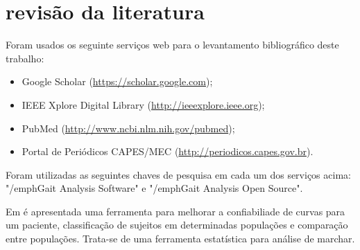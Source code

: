 \section[REVISÃO DA LITERATURA]{revisão da literatura}
Foram usados os seguinte serviços web para o levantamento bibliográfico deste trabalho:
\begin{itemize}
	\item Google Scholar (\href{https://scholar.google.com/}{https://scholar.google.com});
	\item IEEE Xplore Digital Library (\href{http://ieeexplore.ieee.org}{http://ieeexplore.ieee.org});
	\item PubMed (\href{http://www.ncbi.nlm.nih.gov/pubmed}{http://www.ncbi.nlm.nih.gov/pubmed});
	\item Portal de Periódicos CAPES/MEC (\href{http://periodicos.capes.gov.br}{http://periodicos.capes.gov.br}).
\end{itemize}

Foram utilizadas as seguintes chaves de pesquisa em cada um dos serviços acima: "/emph{Gait Analysis Software}" e "/emph{Gait Analysis Open Source}". 

Em \cite{Duhamel2004} é apresentada uma ferramenta para melhorar a confiabiliade de curvas para um paciente, classificação de sujeitos em determinadas populações e comparação entre populações. Trata-se de uma ferramenta estatística para análise de marchar.

